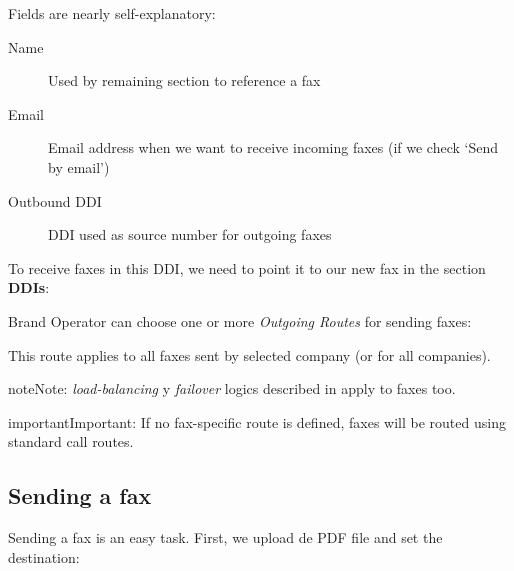 \documentclass[letterpaper,10pt,english]{sphinxmanual}
\begin{document}

Fields are nearly self-explanatory:
\begin{description}
\item[{Name}] \leavevmode{}\label{faxing/index:term-name}
Used by remaining section to reference a fax

\item[{Email}] \leavevmode{}\label{faxing/index:term-email}
Email address when we want to receive incoming faxes (if we check `Send
by email')

\item[{Outbound DDI}] \leavevmode{}\label{faxing/index:term-outbound-ddi}
DDI used as source number for outgoing faxes

\end{description}

To receive faxes in this DDI, we need to point it to our new fax in the section
\textbf{DDIs}:


Brand Operator can choose one or more \emph{Outgoing Routes} for sending faxes:


This route applies to all faxes sent by selected company (or for all companies).

\begin{notice}{note}{Note:}
\emph{load-balancing} y \emph{failover} logics described in {\hyperref[external_outgoing_calls/call_routing:routes\string-metrics]{}}
apply to faxes too.
\end{notice}

\begin{notice}{important}{Important:}
If no fax-specific route is defined, faxes will be routed using
standard call routes.
\end{notice}


\subsection{Sending a fax}
\label{faxing/index:sending-a-fax}
Sending a fax is an easy task. First, we upload de PDF file and set the destination:
\end{document}
